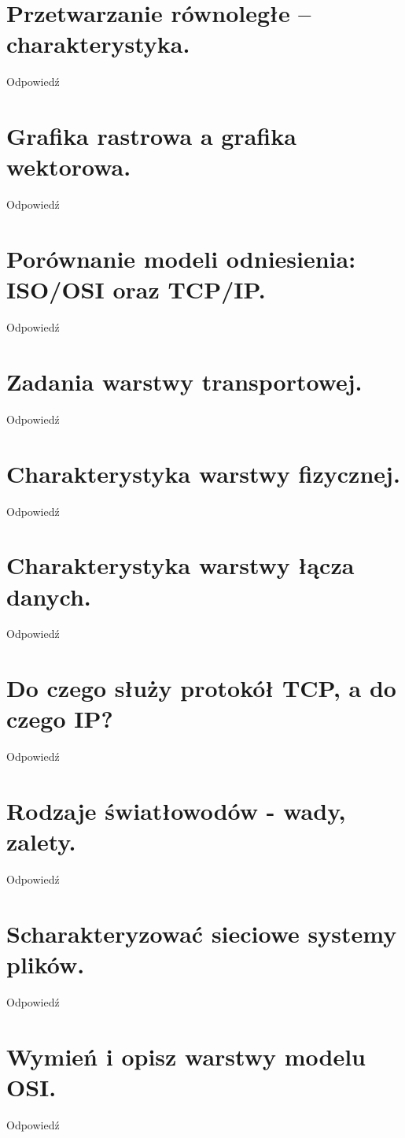 \documentclass[12pt,a4paper]{article}
\begin{document}
	\section{Przetwarzanie równoległe – charakterystyka.}
	Odpowiedź

	\section{Grafika rastrowa a grafika wektorowa.}
	Odpowiedź

	\section{Porównanie modeli odniesienia: ISO/OSI oraz TCP/IP.}
	Odpowiedź

	\section{Zadania warstwy transportowej.}
	Odpowiedź

	\section{Charakterystyka warstwy fizycznej.}
	Odpowiedź

	\section{Charakterystyka warstwy łącza danych.}
	Odpowiedź

	\section{Do czego służy protokół TCP, a do czego IP?}
	Odpowiedź

	\section{Rodzaje światłowodów - wady, zalety.}
	Odpowiedź

	\section{Scharakteryzować sieciowe systemy plików.}
	Odpowiedź

	\section{Wymień i opisz warstwy modelu OSI.}
	Odpowiedź
\end{document}
